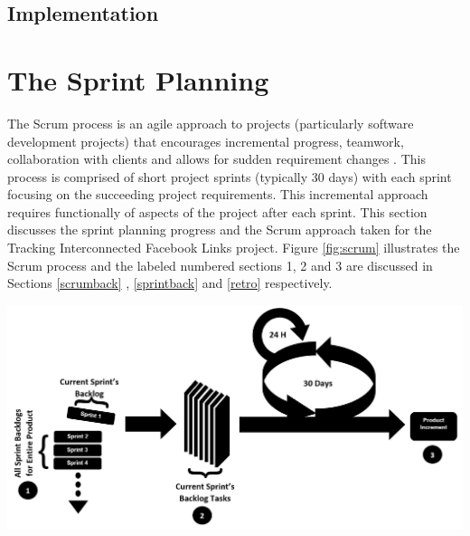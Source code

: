 \documentclass[12pt,onecolumn]{article}
\begin{document}
	\subsection{Implementation} %
	
	\section{The Sprint Planning}
	The Scrum process is an agile approach to projects (particularly software development projects) that encourages incremental progress, teamwork, collaboration with clients and allows for sudden requirement changes \cite{Cohn}. This process is comprised of short project sprints (typically 30 days) with each sprint focusing on the succeeding project requirements. This incremental approach requires functionally of aspects of the project after each sprint. This section discusses the sprint planning progress and the Scrum approach taken for the Tracking Interconnected Facebook Links project. Figure \ref{fig:scrum} illustrates the Scrum process and the labeled numbered sections 1, 2 and 3 are discussed in Sections  \ref{scrumback} ,  \ref{sprintback} and  \ref{retro} respectively.
	
\begin{center}
	\includegraphics[width=\textwidth]{scrum}
	 \label{fig:scrum}
\end{center}
		
		

	
\end{document}
